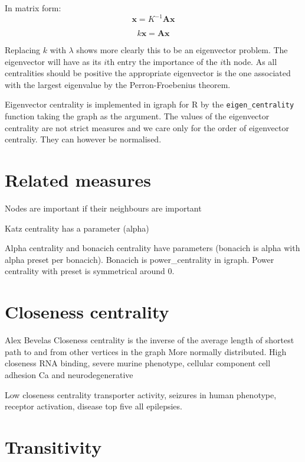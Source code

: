 In matrix form:
\begin{equation}
    \mathbf{x}=K^{-1}\mathbf{Ax}
    \end{equation}
    
    \begin{equation}
         k\mathbf{x}=\mathbf{Ax}
    \end{equation}
  
  Replacing $k$ with $\lambda$ shows more clearly this to be an eigenvector problem. The eigenvector will have as its $i$th entry the importance of the $i$th node. As all centralities should be positive the appropriate eigenvector is the one associated with the largest eigenvalue by the Perron-Froebenius theorem. 
  
  Eigenvector centrality is implemented in igraph for R by the \texttt{eigen\_centrality} function taking the graph as the argument. The values of the eigenvector centrality are not strict measures and we care only for the order of eigenvector centraliy. They can however be normalised. 
  
 \section{Related measures}
\cite{bonacich1987power}
Nodes are important if their neighbours are important 

Katz centrality has a parameter (alpha)
    
Alpha centrality and bonacich centrality have parameters (bonacich is alpha with alpha preset per bonacich). Bonacich is power\_centrality in igraph. Power centrality with preset is symmetrical around 0.  


\section{Closeness centrality}
\label{sec:closenesscentrality}
Alex Bevelas
Closeness centrality is the inverse of the  average length of shortest path to and from other vertices in the graph \cite{freeman1978centrality}
More normally distributed.
High closeness RNA binding, severe murine phenotype, cellular component cell adhesion
Ca and neurodegenerative

Low closeness centrality transporter activity, seizures in human phenotype, receptor activation, disease top five all epilepsies. 
\section{Transitivity}

